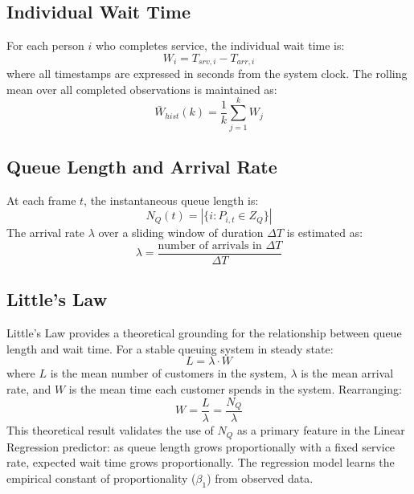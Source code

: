 \documentclass[journal, twocolumn]{IEEEtran}
\begin{document}
\subsection{Individual Wait Time}
For each person $i$ who completes service, the individual wait time is:
\begin{equation}
W_i = T_{srv,i} - T_{arr,i}
\end{equation}
where all timestamps are expressed in seconds from the system clock. The rolling mean over all completed observations is maintained as:
\begin{equation}
\bar{W}_{hist}(k) = \frac{1}{k} \sum_{j=1}^{k} W_j
\end{equation}

\subsection{Queue Length and Arrival Rate}
At each frame $t$, the instantaneous queue length is:
\begin{equation}
N_Q(t) = \left| \{ i : P_{i,t} \in Z_Q \} \right|
\end{equation}
The arrival rate $\lambda$ over a sliding window of duration $\Delta T$ is estimated as:
\begin{equation}
\lambda = \frac{\text{number of arrivals in } \Delta T}{\Delta T}
\end{equation}

\subsection{Little's Law}
Little's Law \cite{kleinrock1975queueing} provides a theoretical grounding for the relationship between queue length and wait time. For a stable queuing system in steady state:
\begin{equation}
L = \lambda \cdot W
\end{equation}
where $L$ is the mean number of customers in the system, $\lambda$ is the mean arrival rate, and $W$ is the mean time each customer spends in the system. Rearranging:
\begin{equation}
W = \frac{L}{\lambda} = \frac{N_Q}{\lambda}
\end{equation}
This theoretical result validates the use of $N_Q$ as a primary feature in the Linear Regression predictor: as queue length grows proportionally with a fixed service rate, expected wait time grows proportionally. The regression model learns the empirical constant of proportionality ($\beta_1$) from observed data.
\end{document}
